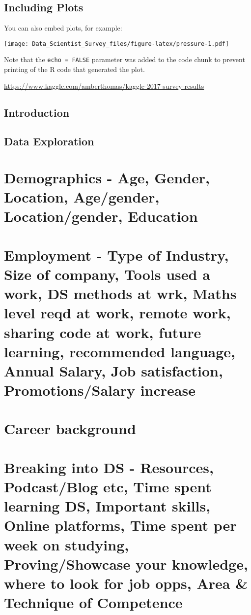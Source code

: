 \documentclass[]{article}
\begin{document}
\subsection{Including Plots}\label{including-plots}

You can also embed plots, for example:

\texttt{[image: Data\_Scientist\_Survey\_files/figure-latex/pressure-1.pdf]}

Note that the \texttt{echo\ =\ FALSE} parameter was added to the code
chunk to prevent printing of the R code that generated the plot.

\url{https://www.kaggle.com/amberthomas/kaggle-2017-survey-results}

\subsection{Introduction}\label{introduction}

\subsection{Data Exploration}\label{data-exploration}

\section{Demographics - Age, Gender, Location, Age/gender,
Location/gender,
Education}\label{demographics---age-gender-location-agegender-locationgender-education}

\section{Employment - Type of Industry, Size of company, Tools used a
work, DS methods at wrk, Maths level reqd at work, remote work, sharing
code at work, future learning, recommended language, Annual Salary, Job
satisfaction, Promotions/Salary
increase}\label{employment---type-of-industry-size-of-company-tools-used-a-work-ds-methods-at-wrk-maths-level-reqd-at-work-remote-work-sharing-code-at-work-future-learning-recommended-language-annual-salary-job-satisfaction-promotionssalary-increase}

\section{Career background}\label{career-background}

\section{Breaking into DS - Resources, Podcast/Blog etc, Time spent
learning DS, Important skills, Online platforms, Time spent per week on
studying, Proving/Showcase your knowledge, where to look for job opps,
Area \& Technique of
Competence}\label{breaking-into-ds---resources-podcastblog-etc-time-spent-learning-ds-important-skills-online-platforms-time-spent-per-week-on-studying-provingshowcase-your-knowledge-where-to-look-for-job-opps-area-technique-of-competence}
\end{document}

